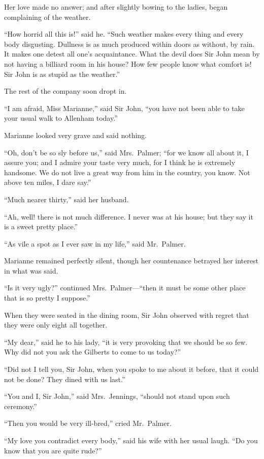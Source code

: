 Her love made no answer; and after slightly bowing
to the ladies, began complaining of the weather.

``How horrid all this is!'' said he.  ``Such weather
makes every thing and every body disgusting.  Dullness
is as much produced within doors as without, by rain.
It makes one detest all one's acquaintance.  What the
devil does Sir John mean by not having a billiard room
in his house?  How few people know what comfort is!  Sir
John is as stupid as the weather.''

The rest of the company soon dropt in.

``I am afraid, Miss Marianne,'' said Sir John, ``you have
not been able to take your usual walk to Allenham today.''

Marianne looked very grave and said nothing.

``Oh, don't be so sly before us,'' said Mrs.\ Palmer;
``for we know all about it, I assure you; and I admire your
taste very much, for I think he is extremely handsome.
We do not live a great way from him in the country, you know.
Not above ten miles, I dare say.''

``Much nearer thirty,'' said her husband.

``Ah, well! there is not much difference.
I never was at his house; but they say it is a sweet
pretty place.''

``As vile a spot as I ever saw in my life,''
said Mr.\ Palmer.

Marianne remained perfectly silent, though her
countenance betrayed her interest in what was said.

``Is it very ugly?'' continued Mrs.\ Palmer---``then it
must be some other place that is so pretty I suppose.''

When they were seated in the dining room, Sir John
observed with regret that they were only eight all together.

``My dear,'' said he to his lady, ``it is very provoking
that we should be so few.  Why did not you ask the Gilberts
to come to us today?''

``Did not I tell you, Sir John, when you spoke to me
about it before, that it could not be done?  They dined
with us last.''

``You and I, Sir John,'' said Mrs.\ Jennings,
``should not stand upon such ceremony.''

``Then you would be very ill-bred,'' cried Mr.\ Palmer.

``My love you contradict every body,'' said his wife
with her usual laugh.  ``Do you know that you are quite rude?''

